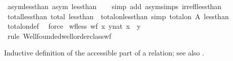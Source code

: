 \begin{isabellebody}
\ asym{\isacharunderscore}{\kern0pt}less{\isacharunderscore}{\kern0pt}than{\isacharcolon}{\kern0pt}\ {\isachardoublequoteopen}asym\ less{\isacharunderscore}{\kern0pt}than{\isachardoublequoteclose}\isanewline
%
\isadelimproof
\ \ %
\endisadelimproof
%
\isatagproof
{}\isamarkupfalse%
\ {\isacharparenleft}{\kern0pt}simp\ add{\isacharcolon}{\kern0pt}\ asym{\isachardot}{\kern0pt}simps\ irrefl{\isacharunderscore}{\kern0pt}less{\isacharunderscore}{\kern0pt}than{\isacharparenright}{\kern0pt}%
\endisatagproof
{\isafoldproof}%
%
\isadelimproof
\isanewline
%
\endisadelimproof
\isanewline
{}\isamarkupfalse%
\ total{\isacharunderscore}{\kern0pt}less{\isacharunderscore}{\kern0pt}than{\isacharcolon}{\kern0pt}\ {\isachardoublequoteopen}total\ less{\isacharunderscore}{\kern0pt}than{\isachardoublequoteclose}\ \ total{\isacharunderscore}{\kern0pt}on{\isacharunderscore}{\kern0pt}less{\isacharunderscore}{\kern0pt}than\ {\isacharbrackleft}{\kern0pt}simp{\isacharbrackright}{\kern0pt}{\isacharcolon}{\kern0pt}\ {\isachardoublequoteopen}total{\isacharunderscore}{\kern0pt}on\ A\ less{\isacharunderscore}{\kern0pt}than{\isachardoublequoteclose}\isanewline
%
\isadelimproof
\ \ %
\endisadelimproof
%
\isatagproof
{}\isamarkupfalse%
\ total{\isacharunderscore}{\kern0pt}on{\isacharunderscore}{\kern0pt}def\ \isamarkupfalse%
\ force{\isacharplus}{\kern0pt}%
\endisatagproof
{\isafoldproof}%
%
\isadelimproof
\isanewline
%
\endisadelimproof
\isanewline
{}\isamarkupfalse%
\ wf{\isacharunderscore}{\kern0pt}less{\isacharcolon}{\kern0pt}\ {\isachardoublequoteopen}wf\ {\isacharbraceleft}{\kern0pt}{\isacharparenleft}{\kern0pt}x{\isacharcomma}{\kern0pt}\ y{\isacharcolon}{\kern0pt}{\isacharcolon}{\kern0pt}nat{\isacharparenright}{\kern0pt}{\isachardot}{\kern0pt}\ x\ {\isacharless}{\kern0pt}\ y{\isacharbraceright}{\kern0pt}{\isachardoublequoteclose}\isanewline
%
\isadelimproof
\ \ %
\endisadelimproof
%
\isatagproof
{}\isamarkupfalse%
\ {\isacharparenleft}{\kern0pt}rule\ Wellfounded{\isachardot}{\kern0pt}wellorder{\isacharunderscore}{\kern0pt}class{\isachardot}{\kern0pt}wf{\isacharparenright}{\kern0pt}%
\endisatagproof
{\isafoldproof}%
%
\isadelimproof
%
\endisadelimproof
%
\isadelimdocument
%
\endisadelimdocument
%
\isatagdocument
%
\isamarkuptrue%
%
\endisatagdocument
{\isafolddocument}%
%
\isadelimdocument
%
\endisadelimdocument
%
\begin{isamarkuptext}%
Inductive definition of the accessible part  of a
  relation; see also \cite{paulin-tlca}.%

\end{isamarkuptext}
\end{isabellebody}

